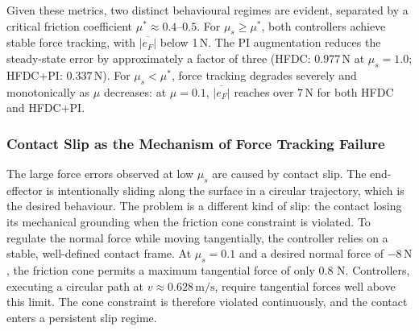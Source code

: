 \documentclass[
	german,%
	accentcolor=9c,%
	ruledheaders=section,%
	class=report,%
	thesis={type=bachelor},%
	fontsize=11pt,%
	parskip=half-,%
	custommargins=true,%
	marginpar=false,%
]{tudapub}
\begin{document}
Given these metrics, two distinct behavioural regimes are evident, separated by a critical
friction coefficient $\mu^* \approx 0.4$--$0.5$.
For $\mu_s \geq \mu^*$, both controllers achieve stable force tracking, with
$\overline{|e_F|}$ below 1\,N.
The PI augmentation reduces the steady-state error by approximately a factor of
three (HFDC: $0.977$\,N at $\mu_s=1.0$; HFDC+PI: $0.337$\,N).
For $\mu_s < \mu^*$, force tracking degrades severely and monotonically as
$\mu$ decreases: at $\mu = 0.1$, $\overline{|e_F|}$ reaches over $7$\,N
for both HFDC and HFDC+PI.

\subsubsection{Contact Slip as the Mechanism of Force Tracking Failure}

The large force errors observed at low $\mu_s$ are caused by contact slip. The end-effector is intentionally sliding along the surface in a circular trajectory, which is the desired behaviour. The problem is a different kind of slip: the contact losing its mechanical grounding when the friction cone constraint is violated. To regulate the normal force while moving tangentially, the controller relies on a stable, well-defined contact frame. At $\mu_s = 0.1$ and a desired normal force of $-8\,\mathrm{N}$, the friction cone permits a maximum tangential force of only 0.8 N. Controllers, executing a circular path at $v \approx 0.628\,\mathrm{m/s}$, require tangential forces well above this limit. The cone constraint is therefore violated continuously, and the contact enters a persistent slip regime.
\end{document}
